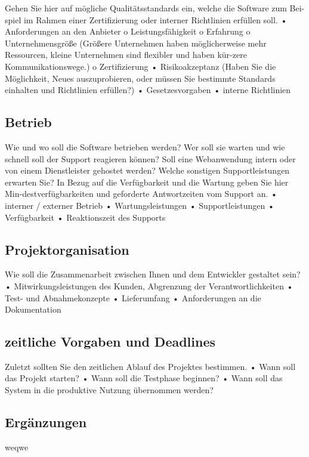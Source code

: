 Gehen Sie hier auf mögliche Qualitätsstandards ein, welche die Software zum Bei-spiel im Rahmen einer Zertifizierung oder interner Richtlinien erfüllen soll. 
•	Anforderungen an den Anbieter 
o	Leistungsfähigkeit
o	Erfahrung
o	Unternehmensgröße (Größere Unternehmen haben möglicherweise mehr Ressourcen, kleine Unternehmen sind flexibler und haben kür-zere Kommunikationswege.)
o	Zertifizierung
•	Risikoakzeptanz (Haben Sie die Möglichkeit, Neues auszuprobieren, oder müssen Sie bestimmte Standards einhalten und Richtlinien erfüllen?) 
•	Gesetzesvorgaben
•	interne Richtlinien

\subsection{Betrieb}

Wie und wo soll die Software betrieben werden? Wer soll sie warten und wie schnell soll der Support reagieren können? Soll eine Webanwendung intern oder von einem Dienstleister gehostet werden? Welche sonstigen Supportleistungen erwarten Sie? In Bezug auf die Verfügbarkeit und die Wartung geben Sie hier Min-destverfügbarkeiten und geforderte Antwortzeiten vom Support an. 
•	interner / externer Betrieb
•	Wartungsleistungen
•	Supportleistungen
•	Verfügbarkeit
•	Reaktionszeit des Supports 

\subsection{Projektorganisation}

Wie soll die Zusammenarbeit zwischen Ihnen und dem Entwickler gestaltet sein? 
•	Mitwirkungsleistungen des Kunden, Abgrenzung der Verantwortlichkeiten
•	Test- und Abnahmekonzepte
•	Lieferumfang
•	Anforderungen an die Dokumentation

\subsection{zeitliche Vorgaben und Deadlines}

Zuletzt sollten Sie den zeitlichen Ablauf des Projektes bestimmen. 
•	Wann soll das Projekt starten?
•	Wann soll die Testphase beginnen? 
•	Wann soll das System in die produktive Nutzung übernommen werden?

\subsection{Ergänzungen}

weqwe
